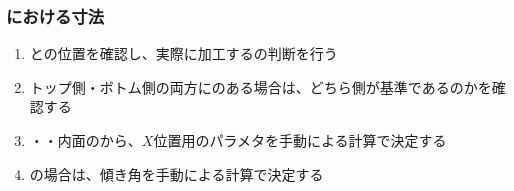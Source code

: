 \clearpage
\subsubsection{\OutcutMilling における寸法}
\begin{enumerate}[label=\sarrow]
\item \OutcutLength と\Keyway の位置を確認し、実際に加工する\OutcutLength の判断を行う
\item トップ側・ボトム側の両方に\Outcut のある場合は、どちら側が基準であるのかを確認する
\item \EndFaceID・\OutcutAsideThickness・内面の\PlatingThk から、\OutcutCenter$X$位置用のパラメタを手動による計算で決定する
\item \CurvedOutcut の場合は、傾き角を手動による計算で決定する
\end{enumerate}
